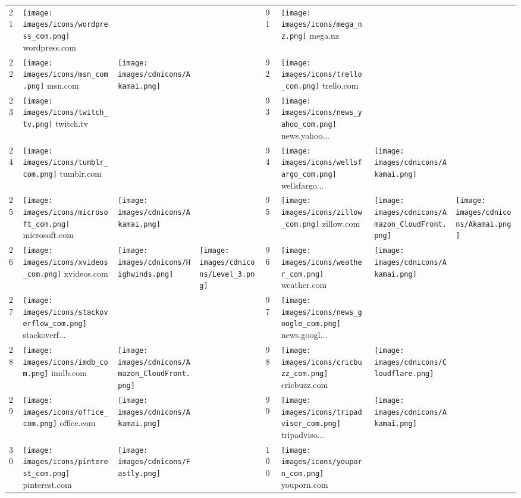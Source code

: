 \begin{table}[tbp]
\begin{tabular}{|llll|llll|}
21 & \texttt{[image: images/icons/wordpress\_com.png]} wordpress.com & & & 91 & \texttt{[image: images/icons/mega\_nz.png]} mega.nz & & \\
22 & \texttt{[image: images/icons/msn\_com.png]} msn.com & \texttt{[image: images/cdnicons/Akamai.png]} & & 92 & \texttt{[image: images/icons/trello\_com.png]} trello.com & & \\
23 & \texttt{[image: images/icons/twitch\_tv.png]} twitch.tv & & & 93 & \texttt{[image: images/icons/news\_yahoo\_com.png]} news.yahoo... & & \\
24 & \texttt{[image: images/icons/tumblr\_com.png]} tumblr.com & & & 94 & \texttt{[image: images/icons/wellsfargo\_com.png]} wellsfargo... & \texttt{[image: images/cdnicons/Akamai.png]} & \\
25 & \texttt{[image: images/icons/microsoft\_com.png]} microsoft.com & \texttt{[image: images/cdnicons/Akamai.png]} & & 95 & \texttt{[image: images/icons/zillow\_com.png]} zillow.com & \texttt{[image: images/cdnicons/Amazon\_CloudFront.png]} & \texttt{[image: images/cdnicons/Akamai.png]} \\
26 & \texttt{[image: images/icons/xvideos\_com.png]} xvideos.com & \texttt{[image: images/cdnicons/Highwinds.png]} & \texttt{[image: images/cdnicons/Level\_3.png]} & 96 & \texttt{[image: images/icons/weather\_com.png]} weather.com & \texttt{[image: images/cdnicons/Akamai.png]} & \\
27 & \texttt{[image: images/icons/stackoverflow\_com.png]} stackoverf... & & & 97 & \texttt{[image: images/icons/news\_google\_com.png]} news.googl... & & \\
28 & \texttt{[image: images/icons/imdb\_com.png]} imdb.com & \texttt{[image: images/cdnicons/Amazon\_CloudFront.png]} & & 98 & \texttt{[image: images/icons/cricbuzz\_com.png]} cricbuzz.com & \texttt{[image: images/cdnicons/Cloudflare.png]} & \\
29 & \texttt{[image: images/icons/office\_com.png]} office.com & \texttt{[image: images/cdnicons/Akamai.png]} & & 99 & \texttt{[image: images/icons/tripadvisor\_com.png]} tripadviso... & \texttt{[image: images/cdnicons/Akamai.png]} & \\
30 & \texttt{[image: images/icons/pinterest\_com.png]} pinterest.com & \texttt{[image: images/cdnicons/Fastly.png]} & & 100 & \texttt{[image: images/icons/youporn\_com.png]} youporn.com & & \\

\end{tabular}
\end{table}
